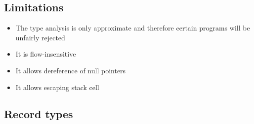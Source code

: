 \subsection{Limitations}
\begin{itemize}
  \item The type analysis is only approximate and therefore certain programs will be unfairly rejected
	\item It is flow-insensitive
	\item It allows dereference of null pointers
	\item It allows escaping stack cell
\end{itemize}

\subsection{Record types}
